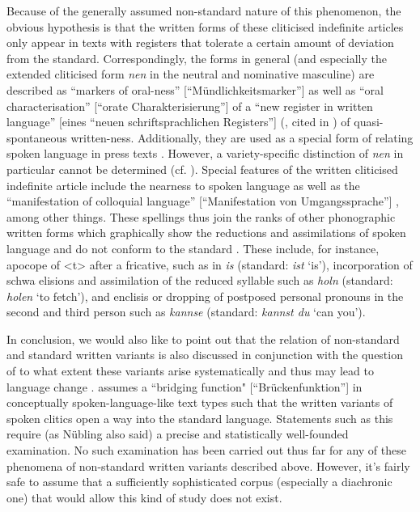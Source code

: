 Because of the generally assumed non-standard nature of this phenomenon, the obvious hypothesis is that the written forms of these cliticised indefinite articles only appear in texts with registers that tolerate a certain amount of deviation from the standard.
Correspondingly, the forms in general (and especially the extended cliticised form \textit{nen} in the neutral and nominative masculine) are described as ``markers of oral-ness'' [``Mündlichkeitsmarker''] \citep{Ziegler2011,Ziegler2012} as well as ``oral characterisation'' [``orate Charakterisierung''] \citep[171]{Tophinke2002} of a ``new register in written language'' [eines ``neuen schriftsprachlichen Registers''] (\citealt{Weingarten1997}, cited in \citealt[3]{Burri2003}) of quasi-spontaneous written-ness.
Additionally, they are used as a special form of relating spoken language in press texts \citep{Ziegler2012}.
However, a variety-specific distinction of \textit{nen} in particular cannot be determined (cf. \citealt[183]{Vogel2006}).
Special features of the written cliticised indefinite article include the nearness to spoken language as well as the ``manifestation of colloquial language'' [``Manifestation von Umgangssprache''] \citep[4]{Burri2003}, among other things.
These spellings thus join the ranks of other phonographic written forms which graphically show the reductions and assimilations of spoken language and do not conform to the standard \citep{Burri2003,Tophinke2002,SchusterTophinke2012}. 
These include, for instance, apocope of <t> after a fricative, such as in \textit{is} (standard: \textit{ist} `is'), incorporation of schwa elisions and assimilation of the reduced syllable such as \textit{holn} (standard: \textit{holen} `to fetch'), and enclisis or dropping of postposed personal pronouns in the second and third person such as \textit{kannse} (standard: \textit{kannst du} `can you').

In conclusion, we would also like to point out that the relation of non-standard and standard written variants is also discussed in conjunction with the question of to what extent these variants arise systematically and thus may lead to language change \citep{HaaseEa1997,Naumann1998,Burri2003,SchusterTophinke2012}.
\citet[307]{Nuebling1992} assumes a ``bridging function" [``Brückenfunktion''] in conceptually spoken-language-like text types such that the written variants of spoken clitics open a way into the standard language.
Statements such as this require (as Nübling also said) a precise and statistically well-founded examination.
No such examination has been carried out thus far for any of these phenomena of non-standard written variants described above.
However, it's fairly safe to assume that a sufficiently sophisticated corpus (especially a diachronic one) that would allow this kind of study does not exist.

